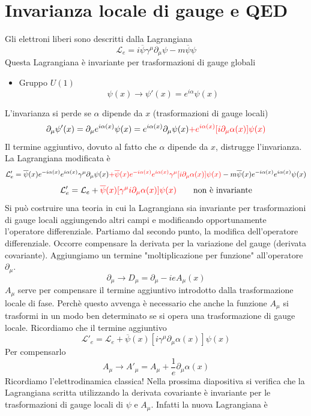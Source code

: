 \section{Invarianza locale di gauge e QED}
Gli elettroni liberi sono descritti dalla Lagrangiana
$$
\mathcal{L}_e = i\overline{\psi}\gamma^\mu\partial_\mu\psi - m\overline{\psi}\psi
$$
Questa Lagrangiana è invariante per trasformazioni di gauge globali
\begin{itemize}
    \item Gruppo $U(1)$
    $$
\psi(x) \to \psi'(x) = e^{i\alpha}\psi(x)
$$
\end{itemize}
L'invarianza si perde se $\alpha$ dipende da $x$ (trasformazioni di gauge locali)
$$
\partial_\mu\psi'(x) = \partial_\mu e^{i\alpha(x)}\psi(x) = e^{i\alpha(x)}\partial_\mu\psi(x) \textcolor{red}{+ e^{i\alpha(x)}[i\partial_\mu\alpha(x)]\psi(x)}
$$
Il termine aggiuntivo, dovuto al fatto che $\alpha$ dipende da $x$, distrugge l'invarianza. La Lagrangiana modificata è
$$
\mathcal{L}'_e = \overline{\psi}(x)e^{-i\alpha(x)} e^{i\alpha(x)} \gamma^\mu \partial_\mu\psi(x) \textcolor{red}{+ \overline{\psi}(x)e^{-i\alpha(x)}e^{i\alpha(x)} \gamma^\mu [i\partial_\mu\alpha(x)]\psi(x)} - m\overline{\psi}(x)e^{-i\alpha(x)}e^{i\alpha(x)}\psi(x)
$$
$$
\mathcal{L}'_e = \mathcal{L}_e +\textcolor{red}{ \overline{\psi}(x) [\gamma^\mu i\partial_\mu\alpha(x)]\psi(x)} \qquad \text{non è invariante}
$$
Si può costruire una teoria in cui la Lagrangiana sia invariante per trasformazioni di gauge locali aggiungendo altri campi e modificando opportunamente l'operatore differenziale. Partiamo dal secondo punto, la modifica dell'operatore differenziale. Occorre compensare la derivata per la variazione del gauge (derivata covariante). Aggiungiamo un termine "moltiplicazione per funzione" all'operatore $\partial_\mu$.
$$
\partial_\mu \to D_\mu = \partial_\mu - ieA_\mu(x)
$$
$A_\mu$ serve per compensare il termine aggiuntivo introdotto dalla trasformazione locale di fase. Perchè questo avvenga è necessario che anche la funzione $A_\mu$ si trasformi in un modo ben determinato se si opera una trasformazione di gauge locale. Ricordiamo che il termine aggiuntivo
$$
\mathcal{L}'_e = \mathcal{L}_e + \overline{\psi}(x) [i\gamma^\mu \partial_\mu\alpha(x)]\psi(x)
$$
Per compensarlo
$$
A_\mu \to A'_\mu = A_\mu + \frac{1}{e}\partial_\mu\alpha(x)
$$
Ricordiamo l'elettrodinamica classica! Nella prossima diapositiva si verifica che la Lagrangiana scritta utilizzando la derivata covariante è invariante per le trasformazioni di gauge locali di $\psi$ e $A_\mu$. Infatti la nuova Lagrangiana è
